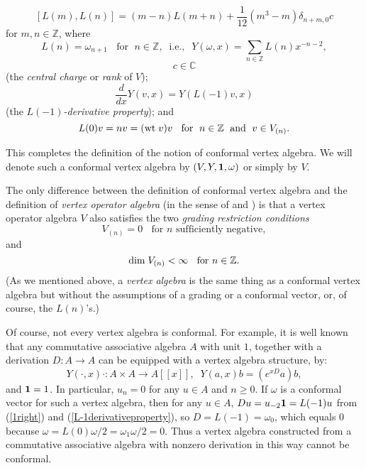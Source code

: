 \documentclass[12pt]{article}
\begin{document}
\begin{defi}
{\begin{equation}\label{vir1}
[L(m), L(n)]=(m-n)L(m+n)+{\displaystyle\frac{1}{12}}
(m^3-m)\delta_{n+m,0}c
\end{equation}
for $m, n \in {\mathbb Z}$, where
\begin{equation}\label{vir2}
L(n)=\omega _{n+1}\;\; \mbox{ for } \;  n\in{\mathbb Z}, \;\;
\mbox{i.e.},\;\;Y(\omega, x)=\sum_{n\in{\mathbb Z}}L(n)x^{-n-2},
\end{equation}
\begin{equation}\label{vir3}
c\in {\mathbb C}
\end{equation}
(the {\it central charge} or {\it rank} of $V$);
\begin{equation}\label{L-1derivativeproperty}
{\displaystyle \frac{d}{dx}}Y(v,
x)=Y(L(-1)v, x)
\end{equation}
(the {\it  $L(-1)$-derivative property}); and
\begin{equation}\label{L0gradingproperty}
L(0)v=nv=(\mbox{\rm wt}\; v)v \;\; \mbox{ for }\; n\in {\mathbb Z}\; \mbox{ and }\;
v\in V_{(n)}.
\end{equation}
}
\end{defi}

This completes the definition of the notion of conformal vertex
algebra.  We will denote such a conformal vertex algebra by $(V,Y,{\bf
1},\omega)$ or simply by $V$.

The only difference between the definition of conformal vertex algebra
and the definition of {\it vertex operator algebra} (in the sense of
\cite{FLM2} and \cite{FHL}) is that a vertex operator algebra $V$
also satisfies the two {\it grading restriction conditions}
\begin{equation}\label{gr1}
V_{(n)}=0 \;\; \mbox{ for }n\mbox{ sufficiently negative},
\end{equation}
and
\begin{equation}\label{gr2}
{\rm dim} \; V_{(n)} < \infty \;\;\mbox{ for }n \in {\mathbb Z}.
\end{equation}
(As we mentioned above, a {\it vertex algebra} is the same thing as a
conformal vertex algebra but without the assumptions of a grading or a
conformal vector, or, of course, the $L(n)$'s.)

\begin{rema}\label{va>cva}{\rm
Of course, not every vertex algebra is conformal. For example, it is
well known \cite{B} that any commutative associative algebra $A$ with
unit $1$, together with a derivation $D:A\to A$ can be equipped with a
vertex algebra structure, by:
\[
Y(\cdot,x)\cdot : A\times A\to A[[x]],\;\;Y(a,x)b=(e^{xD}a)b,
\]
and ${\bf 1}=1$.  In particular, $u_n=0$ for any $u\in A$ and $n\geq
0$.  If $\omega$ is a conformal vector for such a vertex algebra, then
for any $u\in A$, $Du=u_{-2}{\bf 1}=L(-1)u$ {}from (\ref{1right}) and
(\ref{L-1derivativeproperty}), so $D=L(-1)=\omega_0$, which equals $0$
because $\omega=L(0)\omega/2=\omega_1\omega/2=0$.  Thus a vertex
algebra constructed {}from a commutative associative algebra with
nonzero derivation in this way cannot be conformal.  }
\end{rema}
\end{document}
